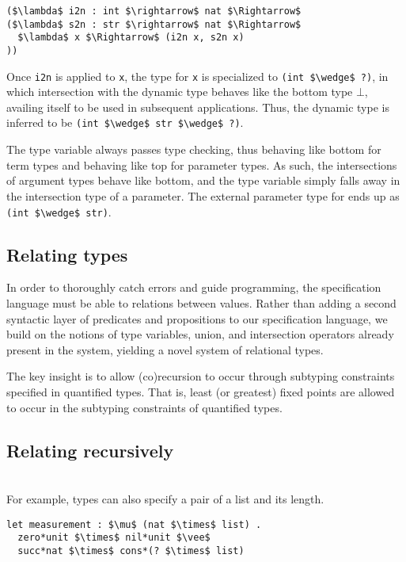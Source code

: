 \documentclass[sigplan,screen]{acmart}
\begin{document}
\begin{lstlisting}
($\lambda$ i2n : int $\rightarrow$ nat $\Rightarrow$ 
($\lambda$ s2n : str $\rightarrow$ nat $\Rightarrow$ 
  $\lambda$ x $\Rightarrow$ (i2n x, s2n x)
))

\end{lstlisting}

Once \lstinline{i2n} is applied to \lstinline{x}, 
the type for \lstinline{x} is specialized to \lstinline{(int $\wedge$ ?)}, 
in which intersection with the dynamic type behaves like the bottom type $\bot$,
availing itself to be used in subsequent applications. 
Thus, the dynamic type is inferred to be \lstinline{(int $\wedge$ str $\wedge$ ?)}.

The type variable always passes type checking, 
thus behaving like bottom for term types
and behaving like top for parameter types.
As such, the intersections of argument types behave like bottom,
and the type variable simply falls away in the intersection type of a parameter.
The external parameter type for ends up as \lstinline{(int $\wedge$ str)}. 


\subsection{Relating types}
In order to thoroughly catch errors and guide programming, 
the specification language must be able to relations
between values. Rather than adding a second syntactic layer 
of predicates and propositions to our specification language,
we build on the notions of type variables, union, and 
intersection operators already present in the system, 
yielding a novel system of relational types.

The key insight is to allow (co)recursion to occur through subtyping
constraints specified in quantified types. 
That is, least (or greatest) fixed points are allowed to occur
in the subtyping constraints of quantified types.


\subsection{Relating recursively}

\hfill \\
For example, types can also specify a pair of a list and its length.

\begin{lstlisting}[]
let measurement : $\mu$ (nat $\times$ list) .
  zero*unit $\times$ nil*unit $\vee$
  succ*nat $\times$ cons*(? $\times$ list)
\end{lstlisting} 
\end{document}
